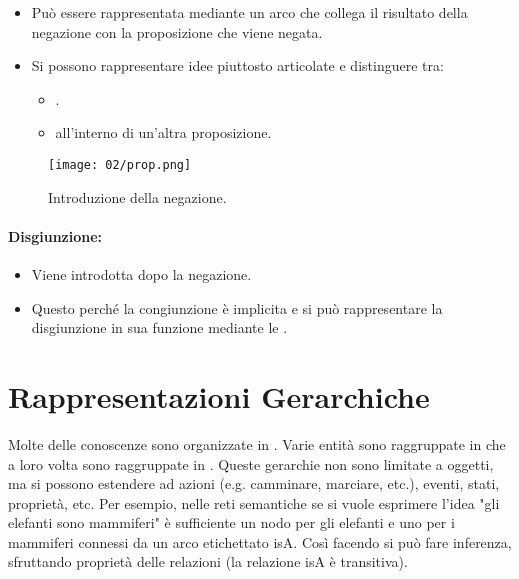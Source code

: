\begin{itemize}
  \item Può essere rappresentata mediante un arco che collega il risultato della negazione con la proposizione che viene negata. 
  \item Si possono rappresentare idee piuttosto articolate e distinguere tra: 
    \begin{itemize}
      \item {}. 
      \item {} all'interno di un'altra proposizione. 
    \end{itemize}
\end{itemize}

\begin{figure}[h]
    \centering
    \texttt{[image: 02/prop.png]}
    \caption{Introduzione della negazione.}
\end{figure}

\paragraph{Disgiunzione:}

\begin{itemize}
  \item Viene introdotta dopo la negazione. 
  \item Questo perché la congiunzione è implicita e si può rappresentare la disgiunzione in sua funzione mediante le .
\end{itemize}


\section{Rappresentazioni Gerarchiche}

Molte delle conoscenze sono organizzate in . Varie entità sono raggruppate in  che a loro volta sono raggruppate in . Queste gerarchie non sono limitate a oggetti, ma si possono estendere ad azioni (e.g. camminare, marciare, etc.), eventi, stati, proprietà, etc. Per esempio, nelle reti semantiche se si vuole esprimere l'idea "gli elefanti sono mammiferi" è sufficiente un nodo per gli elefanti e uno per i mammiferi connessi da un arco etichettato isA. Così facendo si può fare inferenza, sfruttando proprietà delle relazioni (la relazione isA è transitiva). 

